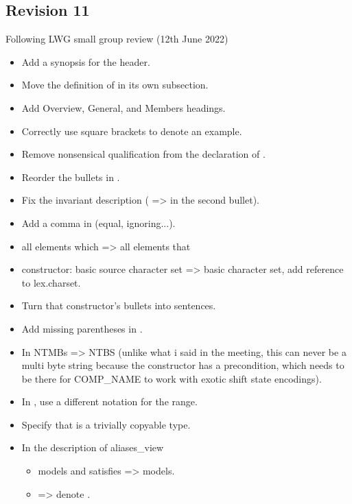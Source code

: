 \documentclass{wg21}
\begin{document}
\subsection*{Revision 11}
Following LWG small group review (12th June 2022)
\begin{itemize}
    \item Add a synopsis for the  header.
    \item Move the definition of  in its own subsection.
    \item Add Overview, General, and Members headings.
    \item Correctly use square brackets to denote an example.
    \item Remove nonsensical  qualification from the declaration of .
    \item Reorder the bullets in .
    \item Fix the  invariant description ( =>  in the second bullet).
    \item Add a comma in  (equal, ignoring...).
    \item all elements which => all elements that
    \item {} constructor: basic source character set => basic character set, add reference to lex.charset.
    \item Turn that constructor's bullets into sentences.
    \item Add missing parentheses in .
    \item In  NTMBs => NTBS (unlike what i said in the meeting, this can never be a multi byte string because the constructor has a precondition, which needs to be there for COMP_NAME to work with exotic shift state encodings).
    \item In , use a different notation for the range.
    \item Specify that  is a trivially copyable type.
    \item In the description of aliases_view
    \begin{itemize}
        \item {} models and satisfies =>  models.
        \item {} => denote .
    \end{itemize}
\end{itemize}
\end{document}
